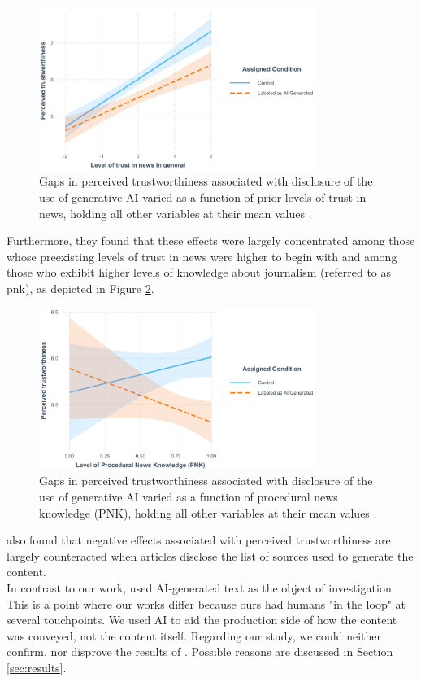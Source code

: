 \documentclass[
  a4paper,  %
  twoside,  %
  bibliography=totoc,
  headsepline,
  cleardoublepage=empty,
  parskip=half,
  draft=false
]{scrbook}
\begin{document}
\begin{figure}[h]
  \centering
  \includegraphics[width=0.8\textwidth]{./graphics/toff/Trust in news.png}
  \caption{Gaps in perceived trustworthiness associated with disclosure of the use of generative AI varied as a function of prior levels of trust in news, holding all other variables at their mean values \cite{toffTheyCouldJust2023}.}
  \label{fig:toff-trust}
\end{figure}

Furthermore, they found that these effects were largely concentrated among those whose preexisting levels of trust in news were higher to begin with and among those who exhibit higher levels of knowledge about journalism (referred to as \gls{pnk}), as depicted in Figure \ref{fig:toff-PNK}.

\begin{figure}[h]
  \centering
  \includegraphics[width=0.8\textwidth]{./graphics/toff/PNK.png}
  \caption{Gaps in perceived trustworthiness associated with disclosure of the use of generative AI varied as a function of procedural news knowledge (PNK), holding all other variables at their mean values \cite{toffTheyCouldJust2023}.}
  \label{fig:toff-PNK}
\end{figure}

\citeauthor{toffTheyCouldJust2023} also found that negative effects associated with perceived trustworthiness are largely counteracted when articles disclose the list of sources used to generate the content. \\
In contrast to our work, \citeauthor{toffTheyCouldJust2023} used AI-generated text as the object of investigation. This is a point where our works differ because ours had humans "in the loop" at several touchpoints. We used AI to aid the production side of how the content was conveyed, not the content itself. Regarding our study, we could neither confirm, nor disprove the results of \citet{toffTheyCouldJust2023}. Possible reasons are discussed in Section \ref{sec:results}.
\end{document}
